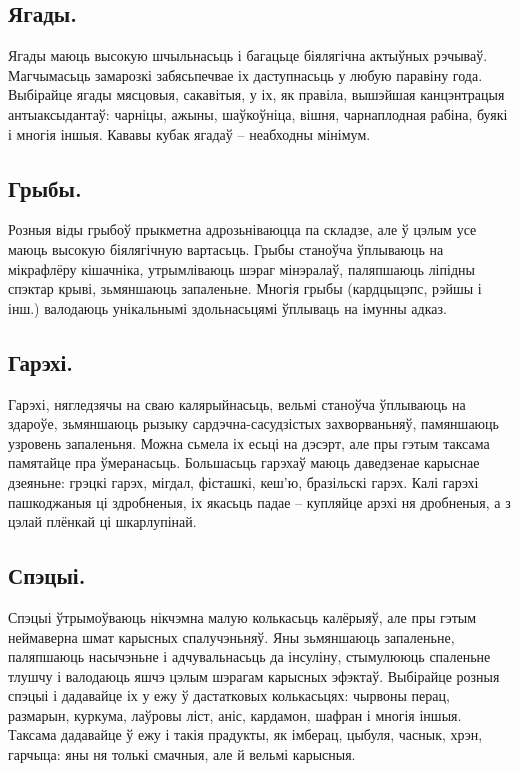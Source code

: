 \subsection{Ягады.}
Ягады маюць высокую шчыльнасьць і багацьце біялягічна актыўных рэчываў. Магчымасьць замарозкі забясьпечвае іх даступнасьць у любую паравіну года. Выбірайце ягады мясцовыя, сакавітыя, у іх, як правіла, вышэйшая канцэнтрацыя антыаксыдантаў: чарніцы, ажыны, шаўкоўніца, вішня, чарнаплодная рабіна, буякі і многія іншыя. Кававы кубак ягадаў – неабходны мінімум.

\subsection{Грыбы.}
Розныя віды грыбоў прыкметна адрозьніваюцца па складзе, але ў цэлым усе маюць высокую біялягічную вартасьць. Грыбы станоўча ўплываюць на мікрафлёру кішачніка, утрымліваюць шэраг мінэралаў, паляпшаюць ліпідны спэктар крыві, зьмяншаюць запаленьне. Многія грыбы (кардцыцэпс, рэйшы і інш.) валодаюць унікальнымі здольнасьцямі ўплываць на імунны адказ.

\subsection{Гарэхі.}
Гарэхі, нягледзячы на сваю калярыйнасьць, вельмі станоўча ўплываюць на здароўе, зьмяншаюць рызыку сардэчна-сасудзістых захворваньняў, памяншаюць узровень запаленьня. Можна сьмела іх есьці на дэсэрт, але пры гэтым таксама памятайце пра ўмеранасьць. Большасьць гарэхаў маюць даведзенае карыснае дзеяньне: грэцкі гарэх, мігдал, фісташкі, кеш'ю, бразільскі гарэх. Калі гарэхі пашкоджаныя ці здробненыя, іх якасьць падае – купляйце арэхі ня дробненыя, а з цэлай плёнкай ці шкарлупінай.

\subsection{Спэцыі.}
Спэцыі ўтрымоўваюць нікчэмна малую колькасьць калёрыяў, але пры гэтым неймаверна шмат карысных спалучэньняў. Яны зьмяншаюць запаленьне, паляпшаюць насычэньне і адчувальнасьць да інсуліну, стымулююць спаленьне тлушчу і валодаюць яшчэ цэлым шэрагам карысных эфэктаў. Выбірайце розныя спэцыі і дадавайце іх у ежу ў дастатковых колькасьцях: чырвоны перац, размарын, куркума, лаўровы ліст, аніс, кардамон, шафран і многія іншыя. Таксама дадавайце ў ежу і такія прадукты, як імберац, цыбуля, часнык, хрэн, гарчыца: яны ня толькі смачныя, але й вельмі карысныя.

